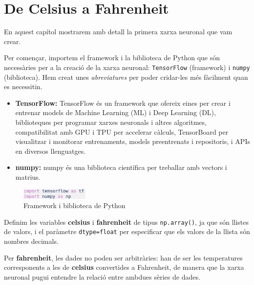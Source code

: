 \chapter{De Celsius a Fahrenheit}\label{a:CelsiusFahrenheit}

En aquest capítol mostrarem amb detall la primera xarxa neuronal que vam crear.

Per començar, importem el framework i la biblioteca de Python que són necessàries per a la creació de la xarxa neuronal: \texttt{TensorFlow} (framework) i \texttt{numpy} (biblioteca). Hem creat unes \textit{abreviatures} per poder cridar-les més fàcilment quan es necessitin.

\begin{itemize}

\item \textbf{TensorFlow: } TensorFlow és un framework que ofereix eines per crear i entrenar models de Machine Learning (ML) i Deep Learning (DL), biblioteques per programar xarxes neuronals i altres algoritmes, compatibilitat amb GPU i TPU per accelerar càlculs, TensorBoard per visualitzar i monitorar entrenaments, models preentrenats i repositoris, i APIs en diversos llenguatges.

\item \textbf{numpy: } numpy és una biblioteca científica per treballar amb vectors i matrius.

\end{itemize}

\begin{figure}[H]

\centering

\includegraphics[width=0.3\textwidth]{./figures/1.png}

\caption{Framework i biblioteca de Python}

\end{figure}

Definim les variables \textbf{celsius} i \textbf{fahrenheit} de tipus \texttt{np.array()}, ja que són llistes de valors, i el paràmetre \texttt{dtype=float} per especificar que els valors de la llista són nombres decimals.

Per \textbf{fahrenheit}, les dades no poden ser arbitràries: han de ser les temperatures corresponents a les de \textbf{celsius} convertides a Fahrenheit, de manera que la xarxa neuronal pugui entendre la relació entre ambdues sèries de dades.

